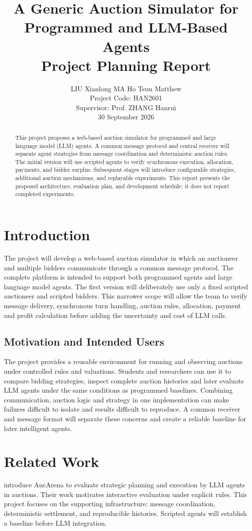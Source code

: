 \documentclass[11pt]{article}
\title{A Generic Auction Simulator for Programmed and LLM-Based Agents\\
\large Project Planning Report}
\author{LIU Xianlong \quad MA Ho Tsun Matthew \\
Project Code: HAN2601 \\
Supervisor: Prof. ZHANG Hanrui \\
30 September 2026}
\begin{document}
\maketitle

\begin{abstract}
This project proposes a web-based auction simulator for programmed and large language model (LLM) agents. A common message protocol and central receiver will separate agent strategies from message coordination and deterministic auction rules. The initial version will use scripted agents to verify synchronous execution, allocation, payments, and bidder surplus. Subsequent stages will introduce configurable strategies, additional auction mechanisms, and replayable experiments. This report presents the proposed architecture, evaluation plan, and development schedule; it does not report completed experiments.
\end{abstract}

\section{Introduction}
The project will develop a web-based auction simulator in which an auctioneer and multiple bidders communicate through a common message protocol. The complete platform is intended to support both programmed agents and large language model agents. The first version will deliberately use only a fixed scripted auctioneer and scripted bidders. This narrower scope will allow the team to verify message delivery, synchronous turn handling, auction rules, allocation, payment and profit calculation before adding the uncertainty and cost of LLM calls.

\subsection{Motivation and Intended Users}
The project provides a reusable environment for running and observing auctions under controlled rules and valuations. Students and researchers can use it to compare bidding strategies, inspect complete auction histories and later evaluate LLM agents under the same conditions as programmed baselines. Combining communication, auction logic and strategy in one implementation can make failures difficult to isolate and results difficult to reproduce. A common receiver and message format will separate these concerns and create a reliable baseline for later intelligent agents.

\section{Related Work}
\citet{chen2024auction} introduce AucArena to evaluate strategic planning and execution by LLM agents in auctions. Their work motivates interactive evaluation under explicit rules. This project focuses on the supporting infrastructure: message coordination, deterministic settlement, and reproducible histories. Scripted agents will establish a baseline before LLM integration.
\end{document}
